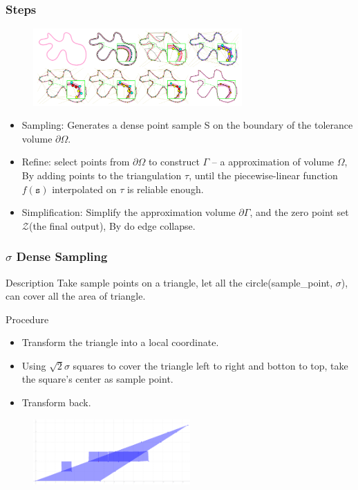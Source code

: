 \documentclass{beamer}
\begin{document}

\begin{frame}
\frametitle{Steps}
\begin{figure}[h]
  \includegraphics[width=8cm]{overview}
\end{figure}
\begin{itemize}
  \item Sampling: Generates a dense point sample S on the boundary of the tolerance volume $\partial \Omega$.
  \item Refine: select points from $\partial \Omega$ to construct $\Gamma$ -- a approximation of volume $\Omega$, By adding points to the triangulation $\tau$, until the piecewise-linear function $f(\mathtt{s})$ interpolated on $\tau$ is reliable enough.
  \item Simplification: Simplify the approximation volume $\partial \Gamma$, and the zero point set $\mathcal{Z}$(the final output), By do edge collapse.
\end{itemize}
\end{frame}


\begin{frame}
\frametitle{$\sigma$ Dense Sampling}
\begin{block}{Description}
Take sample points on a triangle, let all the circle(sample\_point, $\sigma$), can cover all the area of triangle.
\end{block}
\begin{block}{Procedure}
\begin{itemize}
  \item Transform the triangle into a local coordinate.
  \item Using $\sqrt{2} \sigma$ squares to cover the triangle left to right and botton to top, take the square's center as sample point.
  \item Transform back.
\end{itemize}
\end{block}
\begin{figure}[h]
  \includegraphics[width=6cm]{sampling}
\end{figure}
\end{frame}
\end{document}

